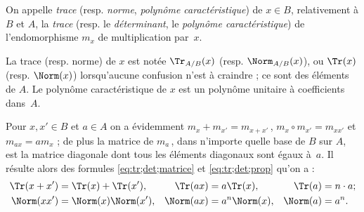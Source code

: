 \documentclass[11pt, useosf,
  title in boldface,
  theorem in new line,
  theorem numbering = section,
  number theorems separately,
]{simplivre}
\begin{document}
    \begin{definition}\label{def:trace;norme;polynôme caractéristique}
        On appelle \emph{trace} (resp. \emph{norme}, \emph{polynôme caractéristique}) de \( x \in B \), relativement à \( B \) et \( A \), la \emph{trace} (resp. le \emph{déterminant}, le \emph{polynôme caractéristique}) de l'endomorphisme \( m_x \) de multiplication par~\( x \).
    \end{definition}

    La trace (resp. norme) de \( x \) est notée \( \Tr_{A/B}(x) \) (resp. \( \Norm_{A/B}(x) \)), ou \( \Tr(x) \) (resp. \( \Norm(x) \)) lorsqu'aucune confusion n'est à craindre ; ce sont des éléments de \( A \). Le polynôme caractéristique de \( x \) est un polynôme unitaire à coefficients dans~\( A \).

    Pour \( x,x' \in B \) et \( a \in A \) on a évidemment \( m_x + m_{x'} = m_{x+x'} \)\,, \( m_x \circ m_{x'} = m_{x x'} \) et \( m_{ax} = a m_x \) ; de plus la matrice de \( m_a \)\,, dans n'importe quelle base de \( B \) sur \( A \), est la matrice diagonale dont tous les éléments diagonaux sont égaux à~\( a \). Il résulte alors des formules \eqref{eq:tr;det;matrice} et \eqref{eq:tr;det;prop} qu'on a :
    \begin{equation}
        \begin{alignedat}{5}
            \Tr(x+x') &= \Tr(x) + \Tr(x'),\quad &\Tr(ax)& &&= a\Tr(x), \quad &\Tr(a)& &&= n \cdot a ;\\
            \Norm(xx') &= \Norm(x)\Norm(x'), \quad &\Norm(ax)& &&= a^n \Norm(x), \quad &\Norm(a)& &&= a^n.
        \end{alignedat}
    \end{equation}
\end{document}
